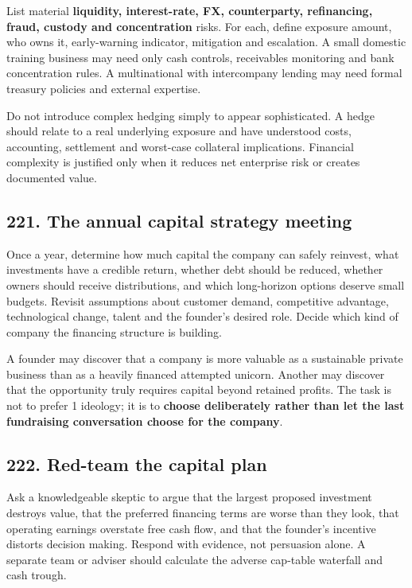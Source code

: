 List material \textbf{liquidity, interest-rate, FX, counterparty, refinancing, fraud, custody and concentration} risks. For each, define exposure amount, who owns it, early-warning indicator, mitigation and escalation. A small domestic training business may need only cash controls, receivables monitoring and bank concentration rules. A multinational with intercompany lending may need formal treasury policies and external expertise.

Do not introduce complex hedging simply to appear sophisticated. A hedge should relate to a real underlying exposure and have understood costs, accounting, settlement and worst-case collateral implications. Financial complexity is justified only when it reduces net enterprise risk or creates documented value.

\subsection{221. The annual capital strategy meeting}


Once a year, determine how much capital the company can safely reinvest, what investments have a credible return, whether debt should be reduced, whether owners should receive distributions, and which long-horizon options deserve small budgets. Revisit assumptions about customer demand, competitive advantage, technological change, talent and the founder's desired role. Decide which kind of company the financing structure is building.

A founder may discover that a company is more valuable as a sustainable private business than as a heavily financed attempted unicorn. Another may discover that the opportunity truly requires capital beyond retained profits. The task is not to prefer 1 ideology; it is to \textbf{choose deliberately rather than let the last fundraising conversation choose for the company}.

\subsection{222. Red-team the capital plan}


Ask a knowledgeable skeptic to argue that the largest proposed investment destroys value, that the preferred financing terms are worse than they look, that operating earnings overstate free cash flow, and that the founder's incentive distorts decision making. Respond with evidence, not persuasion alone. A separate team or adviser should calculate the adverse cap-table waterfall and cash trough.

